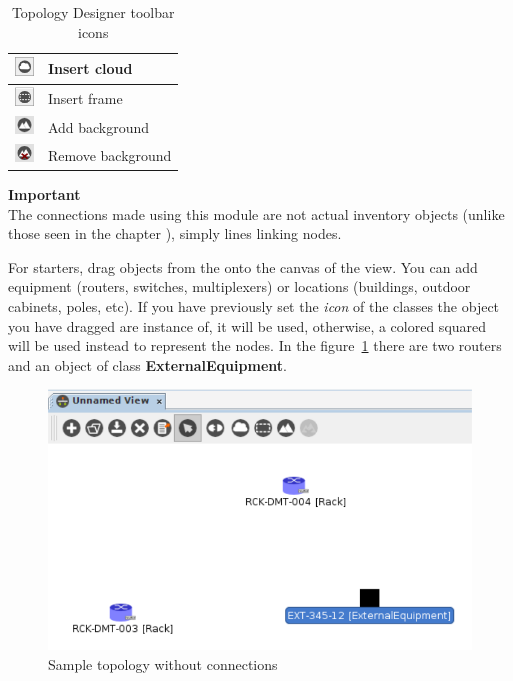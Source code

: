 \documentclass[a4paper]{article}
\begin{document}
\begin{table}[h!]
\begin{tabular}{lp{10cm}}
				\midrule
				\includegraphics[width=0.5cm]{img/icon_cloud.png} & Insert cloud \\
				\midrule
				\includegraphics[width=0.5cm]{img/icon_frame.png} & Insert frame \\
				\midrule
				\includegraphics[width=0.5cm]{img/icon_add_background.png} & Add background \\
				\midrule
				\includegraphics[width=0.5cm]{img/icon_remove_background.png} & Remove background \\
			\end{tabular}
			\caption{Topology Designer toolbar icons}
			\label{tab:topology_designer_icons}
		\end{table}
		\begin{framed} {\large \textbf{Important}}\\
			The connections made using this module are not actual inventory objects (unlike those seen in the chapter \textbf{}), simply lines linking nodes.							
		\end{framed}
		
		For starters, drag objects from the \textbf{} onto the canvas of the view. You can add equipment (routers, switches, multiplexers) or locations (buildings, outdoor cabinets, poles, etc). If you have previously set the \textit{icon} of the classes the object you have dragged are instance of, it will be used, otherwise, a colored squared will be used instead to represent the nodes. In the figure~\ref{fig:topology_designer_initial_view} there are two routers and an object of class \textbf{ExternalEquipment}. 
		\begin{figure}[h!]
			\centering
			\includegraphics[width=0.6\linewidth]{img/topology_designer_initial_view.png}
			\caption{Sample topology without connections}
			\label{fig:topology_designer_initial_view}
		\end{figure}
		
\end{document}
